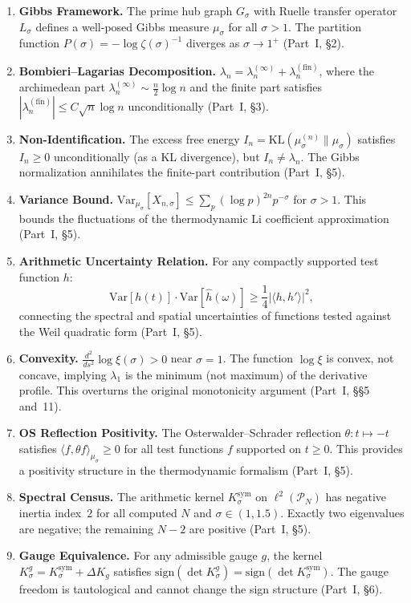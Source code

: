 \documentclass[12pt,a4paper]{article}
\theoremstyle{definition}
\theoremstyle{remark}
\newcommand{\Ksym}{K_\sigma^{\mathrm{sym}}}
\newcommand{\muG}{\mu_\sigma}
\newcommand{\PP}{\mathcal{P}}
\begin{document}
\begin{enumerate}[label=\textbf{R\arabic*},leftmargin=3em]
  \item \textbf{Gibbs Framework.} The prime hub graph $G_\sigma$ with Ruelle transfer operator $L_\sigma$ defines a well-posed Gibbs measure $\muG$ for all $\sigma > 1$. The partition function $P(\sigma) = -\log\zeta(\sigma)^{-1}$ diverges as $\sigma \to 1^+$ (Part~I, \S2).

  \item \textbf{Bombieri--Lagarias Decomposition.} $\lambda_n = \lambda_n^{(\infty)} + \lambda_n^{(\mathrm{fin})}$, where the archimedean part $\lambda_n^{(\infty)} \sim \frac{n}{2}\log n$ and the finite part satisfies $|\lambda_n^{(\mathrm{fin})}| \leq C\sqrt{n}\log n$ unconditionally (Part~I, \S3).

  \item \textbf{Non-Identification.} The excess free energy $I_n = \mathrm{KL}(\mu_\sigma^{(n)} \| \muG)$ satisfies $I_n \geq 0$ unconditionally (as a KL divergence), but $I_n \neq \lambda_n$. The Gibbs normalization annihilates the finite-part contribution (Part~I, \S5).

  \item \textbf{Variance Bound.} $\mathrm{Var}_{\muG}[X_{n,\sigma}] \leq \sum_p (\log p)^{2n}p^{-\sigma}$ for $\sigma > 1$. This bounds the fluctuations of the thermodynamic Li coefficient approximation (Part~I, \S5).

  \item \textbf{Arithmetic Uncertainty Relation.} For any compactly supported test function $h$:
  \[ \mathrm{Var}[h(t)] \cdot \mathrm{Var}[\hat{h}(\omega)] \geq \frac{1}{4}\bigl|\langle h, h' \rangle\bigr|^2, \]
  connecting the spectral and spatial uncertainties of functions tested against the Weil quadratic form (Part~I, \S5).

  \item \textbf{Convexity.} $\frac{d^2}{ds^2}\log\xi(\sigma) > 0$ near $\sigma = 1$. The function $\log\xi$ is convex, not concave, implying $\lambda_1$ is the minimum (not maximum) of the derivative profile. This overturns the original monotonicity argument (Part~I, \S\S5 and~11).

  \item \textbf{OS Reflection Positivity.} The Osterwalder--Schrader reflection $\theta: t \mapsto -t$ satisfies $\langle f, \theta f \rangle_{\muG} \geq 0$ for all test functions $f$ supported on $t \geq 0$. This provides a positivity structure in the thermodynamic formalism (Part~I, \S5).

  \item \textbf{Spectral Census.} The arithmetic kernel $\Ksym$ on $\ell^2(\PP_N)$ has negative inertia index~$2$ for all computed $N$ and $\sigma \in (1, 1.5)$. Exactly two eigenvalues are negative; the remaining $N-2$ are positive (Part~I, \S5).

  \item \textbf{Gauge Equivalence.} For any admissible gauge $g$, the kernel $K_\sigma^g = \Ksym + \Delta K_g$ satisfies $\mathrm{sign}(\det K_\sigma^g) = \mathrm{sign}(\det \Ksym)$. The gauge freedom is tautological and cannot change the sign structure (Part~I, \S6).
\end{enumerate}
\end{document}
